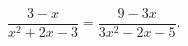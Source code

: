 \begin{ex}[type=equation]
	\begin{condition}
		$\dfrac{3 - x}{x^2 + 2x - 3} = \dfrac{9 - 3x}{3x^2 - 2x -5}.$
	\end{condition}
\end{ex}